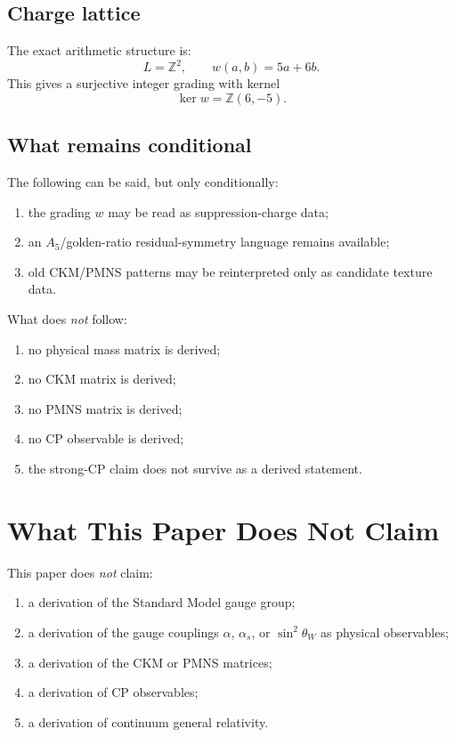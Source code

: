 \documentclass[12pt,a4paper]{article}
\theoremstyle{definition}
\begin{document}
\subsection{Charge lattice}

The exact arithmetic structure is:
\[
L=\mathbb{Z}^2,
\qquad
w(a,b)=5a+6b.
\]
This gives a surjective integer grading with kernel
\[
\ker w = \mathbb{Z}(6,-5).
\]

\subsection{What remains conditional}

The following can be said, but only conditionally:

\begin{enumerate}
\item the grading \(w\) may be read as suppression-charge data;
\item an \(A_5\)/golden-ratio residual-symmetry language remains available;
\item old CKM/PMNS patterns may be reinterpreted only as candidate texture data.
\end{enumerate}

What does \emph{not} follow:

\begin{enumerate}
\item no physical mass matrix is derived;
\item no CKM matrix is derived;
\item no PMNS matrix is derived;
\item no CP observable is derived;
\item the strong-CP claim does not survive as a derived statement.
\end{enumerate}

\section{What This Paper Does Not Claim}

This paper does \emph{not} claim:

\begin{enumerate}
\item a derivation of the Standard Model gauge group;
\item a derivation of the gauge couplings \(\alpha\), \(\alpha_s\), or
  \(\sin^2\theta_W\) as physical observables;
\item a derivation of the CKM or PMNS matrices;
\item a derivation of CP observables;
\item a derivation of continuum general relativity.
\end{enumerate}
\end{document}
